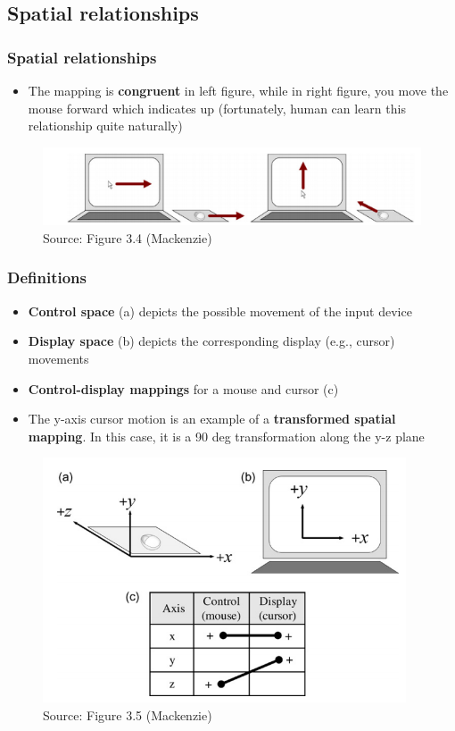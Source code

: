 \documentclass{beamer}
\begin{document}
\subsection{Spatial relationships}

\begin{frame}
	\frametitle{Spatial relationships}
	\begin{itemize}
		\item The mapping is \textbf{congruent} in left figure, while in right figure, you move the mouse forward which indicates up (fortunately, human can learn this relationship quite naturally)
	\end{itemize}
	\begin{figure}
		\includegraphics[width=1\linewidth]{image/3-4}
		\caption{Source: Figure 3.4 (Mackenzie)}
	\end{figure}
\end{frame}

\begin{frame}
	\footnotesize
	\frametitle{Definitions}
	\begin{itemize}
		\item \textbf{Control space} (a) depicts the possible movement of the input device
		\item \textbf{Display space} (b) depicts the corresponding display (e.g., cursor) movements
		\item \textbf{Control-display mappings} for a mouse and cursor (c) 
		\item The y-axis cursor motion is an example of a \textbf{transformed spatial mapping}.  In this case, it is a 90 deg transformation along the y-z plane
	\end{itemize}
	\begin{figure}
		\includegraphics[width=0.5\linewidth]{image/3-5}
		\caption{Source: Figure 3.5 (Mackenzie)}
	\end{figure}
\end{frame}
\end{document}
